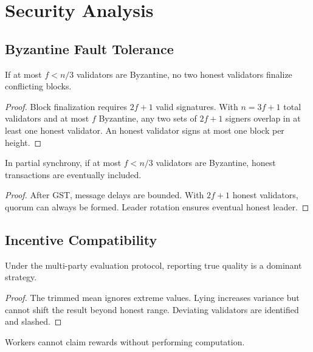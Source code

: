 \section{Security Analysis}

\label{sec:security}

\subsection{Byzantine Fault Tolerance}

\begin{theorem}[Safety]
If at most $f < n/3$ validators are Byzantine, no two honest validators finalize conflicting blocks.
\end{theorem}

\begin{proof}
Block finalization requires $2f+1$ valid signatures. With $n = 3f+1$ total validators and at most $f$ Byzantine, any two sets of $2f+1$ signers overlap in at least one honest validator. An honest validator signs at most one block per height.
\end{proof}

\begin{theorem}[Liveness]
In partial synchrony, if at most $f < n/3$ validators are Byzantine, honest transactions are eventually included.
\end{theorem}

\begin{proof}
After GST, message delays are bounded. With $2f+1$ honest validators, quorum can always be formed. Leader rotation ensures eventual honest leader.
\end{proof}

\subsection{Incentive Compatibility}

\begin{theorem}
Under the multi-party evaluation protocol, reporting true quality is a dominant strategy.
\end{theorem}

\begin{proof}
The trimmed mean ignores extreme values. Lying increases variance but cannot shift the result beyond honest range. Deviating validators are identified and slashed.
\end{proof}

\begin{theorem}
Workers cannot claim rewards without performing computation.
\end{theorem}

